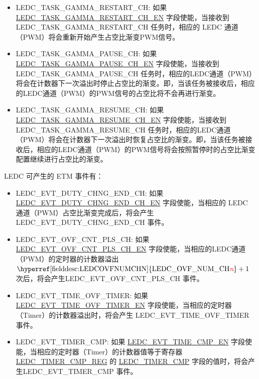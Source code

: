 \documentclass[main\_\_CN.tex]{subfiles}
\begin{document}
\begin{itemize}
\item LEDC\_TASK\_GAMMA\_RESTART\_CH: 如果 \hyperref[fielddesc:LEDCTASKGAMMARESTARTCHNEN]{LEDC\_TASK\_GAMMA\_RESTART\_CH\_EN} 字段使能，当接收到 LEDC\_TASK\_GAMMA\_RESTART\_CH 任务时，相应的 LEDC 通道（PWM）将会重新开始产生占空比渐变PWM信号。
\item LEDC\_TASK\_GAMMA\_PAUSE\_CH: 如果 \hyperref[fielddesc:LEDCTASKGAMMAPAUSECHNEN]{LEDC\_TASK\_GAMMA\_PAUSE\_CH\_EN} 字段使能，当接收到 LEDC\_TASK\_GAMMA\_PAUSE\_CH 任务时，相应的LEDC通道（PWM）将会在计数器下一次溢出时停止占空比的渐变。即，当该任务被接收后，相应的LEDC通道（PWM）的PWM信号的占空比将不会再进行渐变。
\item LEDC\_TASK\_GAMMA\_RESUME\_CH: 如果 \hyperref[fielddesc:LEDCTASKGAMMARESUMECHNEN]{LEDC\_TASK\_GAMMA\_RESUME\_CH\_EN} 字段使能，当接收到 LEDC\_TASK\_GAMMA\_RESUME\_CH 任务时，相应的LEDC通道（PWM）将会在计数器下一次溢出时恢复占空比的渐变。即，当该任务被接收后，相应的LEDC通道（PWM）的PWM信号将会按照暂停时的占空比渐变配置继续进行占空比的渐变。
\end{itemize}

LEDC 可产生的 ETM 事件有：

\begin{itemize}
    \item LEDC\_EVT\_DUTY\_CHNG\_END\_CH: 如果 \hyperref[fielddesc:LEDCEVTDUTYCHNGENDCHNEN]{LEDC\_EVT\_DUTY\_CHNG\_END\_CH\_EN} 字段使能，当相应的 LEDC 通道（PWM）占空比渐变完成后，将会产生 LEDC\_EVT\_DUTY\_CHNG\_END\_CH 事件。
    \item LEDC\_EVT\_OVF\_CNT\_PLS\_CH: 如果 \hyperref[fielddesc:LEDCEVTOVFCNTPLSCHNEN]{LEDC\_EVT\_OVF\_CNT\_PLS\_CH\_EN} 字段使能，当相应的LEDC通道（PWM）的定时器的计数器溢出$ \textrm{\hyperref[fielddesc:LEDCOVFNUMCHN]{LEDC\_OVF\_NUM\_CH\regindex{n}}} + 1 $ 次后，将会产生LEDC\_EVT\_OVF\_CNT\_PLS\_CH 事件。
    \item LEDC\_EVT\_TIME\_OVF\_TIMER: 如果 \hyperref[fielddesc:LEDCEVTTIMEOVFTIMERXEN]{LEDC\_EVT\_TIME\_OVF\_TIMER\_EN} 字段使能，当相应的定时器（Timer）的计数器溢出时，将会产生 LEDC\_EVT\_TIME\_OVF\_TIMER 事件。
    \item LEDC\_EVT\_TIMER\_CMP: 如果 \hyperref[fielddesc:LEDCEVTTIMENCMPEN]{LEDC\_EVT\_TIME\_CMP\_EN} 字段使能，当相应的定时器（Timer）的计数器值等于寄存器 \hyperref[regdesc:LEDCTIMERXCMPREG]{LEDC\_TIMER\_CMP\_REG} 的 \hyperref[fielddesc:LEDCTIMERXCMP]{LEDC\_TIMER\_CMP} 字段的值时，将会产生LEDC\_EVT\_TIMER\_CMP 事件。
\end{itemize}
\end{document}
